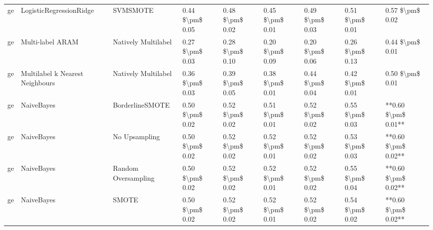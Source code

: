 \begin{tabular}{lllllllll}
      ge &         LogisticRegressionRidge &                      SVMSMOTE & 0.44 \$\textbackslash pm\$ 0.05 &           0.48 \$\textbackslash pm\$ 0.02 &       0.45 \$\textbackslash pm\$ 0.01 &        0.49 \$\textbackslash pm\$ 0.03 &                         0.51 \$\textbackslash pm\$ 0.01 &     0.57 \$\textbackslash pm\$ 0.02 \\
      ge &                Multi-label ARAM &           Natively Multilabel & 0.27 \$\textbackslash pm\$ 0.03 &           0.28 \$\textbackslash pm\$ 0.10 &       0.20 \$\textbackslash pm\$ 0.09 &        0.20 \$\textbackslash pm\$ 0.06 &                         0.26 \$\textbackslash pm\$ 0.13 &     0.44 \$\textbackslash pm\$ 0.01 \\
      ge & Multilabel k Nearest Neighbours &           Natively Multilabel & 0.36 \$\textbackslash pm\$ 0.03 &           0.39 \$\textbackslash pm\$ 0.05 &       0.38 \$\textbackslash pm\$ 0.01 &        0.44 \$\textbackslash pm\$ 0.04 &                         0.42 \$\textbackslash pm\$ 0.01 &     0.50 \$\textbackslash pm\$ 0.01 \\
      ge &                      NaiveBayes &               BorderlineSMOTE & 0.50 \$\textbackslash pm\$ 0.02 &           0.52 \$\textbackslash pm\$ 0.02 &       0.51 \$\textbackslash pm\$ 0.01 &        0.52 \$\textbackslash pm\$ 0.02 &                         0.55 \$\textbackslash pm\$ 0.03 & **0.60 \$\textbackslash pm\$ 0.01** \\
      ge &                      NaiveBayes &                 No Upsampling & 0.50 \$\textbackslash pm\$ 0.02 &           0.52 \$\textbackslash pm\$ 0.02 &       0.52 \$\textbackslash pm\$ 0.01 &        0.52 \$\textbackslash pm\$ 0.02 &                         0.53 \$\textbackslash pm\$ 0.03 & **0.60 \$\textbackslash pm\$ 0.02** \\
      ge &                      NaiveBayes &           Random Oversampling & 0.50 \$\textbackslash pm\$ 0.02 &           0.52 \$\textbackslash pm\$ 0.02 &       0.52 \$\textbackslash pm\$ 0.01 &        0.52 \$\textbackslash pm\$ 0.02 &                         0.55 \$\textbackslash pm\$ 0.04 & **0.60 \$\textbackslash pm\$ 0.02** \\
      ge &                      NaiveBayes &                         SMOTE & 0.50 \$\textbackslash pm\$ 0.02 &           0.52 \$\textbackslash pm\$ 0.02 &       0.52 \$\textbackslash pm\$ 0.01 &        0.52 \$\textbackslash pm\$ 0.02 &                         0.54 \$\textbackslash pm\$ 0.02 & **0.60 \$\textbackslash pm\$ 0.02** \\

\end{tabular}
